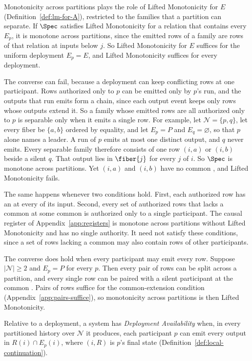 Monotonicity across partitions plays the role of Lifted Monotonicity for $E$
(Definition~\ref{def:lm-for-A}), restricted to the families that a partition
can separate.  If $\Spec$ satisfies Lifted Monotonicity for a relation that
contains every $E_p$, it is monotone across partitions, since the emitted rows
of a family are rows of that relation at inputs below $j$.  So Lifted
Monotonicity for $E$ suffices for the uniform deployment $E_p=E$, and Lifted
Monotonicity suffices for every deployment.

The converse can fail, because a deployment can keep conflicting rows at one
participant.  Rows authorized only to $p$ can be emitted only by $p$'s run,
and the outputs that run emits form a chain, since each output event keeps
only rows whose outputs extend it.  So a family whose emitted rows are all
authorized only to $p$ is separable only when it emits a single row.  For
example, let $\mathcal N=\{p,q\}$, let every fiber be $\{a,b\}$ ordered by
equality, and let $E_p=P$ and $E_q=\varnothing$, so that $p$ alone names a
leader.  A run of $p$ emits at most one distinct output, and $q$ never emits.
Every separable family therefore consists of one row $(i,a)$ or $(i,b)$ beside
a silent $q$.  That output lies in $\fiber{j}$ for every \indesc $j$ of $i$.
So $\Spec$ is monotone across partitions.  Yet $(i,a)$ and $(i,b)$ have no
common \outnoun, and Lifted Monotonicity fails.

The same happens whenever two conditions hold.  First, each authorized row has
an \outnoun at every \indesc of its input.  Second, every set of authorized
rows that lacks a common \outnoun at some common \indesc is authorized only to
a single participant.  The causal register of Appendix~\ref{app:registers} is
monotone across partitions without Lifted Monotonicity and has no single
authority.  It need not satisfy these conditions, since a set of rows lacking
a common \outnoun may also contain rows of other participants.

The converse does hold when every participant may emit every row.  Suppose
$|\mathcal N|\ge2$ and $E_p=P$ for every $p$.  Then every pair of rows can be
split across a partition, and every single row can be paired with a silent
participant at the common \indesc.  Pairs of rows suffice for the
common-extension condition (Appendix~\ref{app:pairs-suffice}), so
monotonicity across partitions is then Lifted Monotonicity.

\begin{definition}
\label{def:deployment-availability}
Relative to a deployment, a system has \emph{Deployment Availability} when, in
every partitioned history over $\mathcal N$ it produces, each participant $p$
can emit every output in $R(i)\cap E_p(i)$, where $(i,R)$ is $p$'s final state
(Definition~\ref{def:local-continuation}).
\end{definition}

